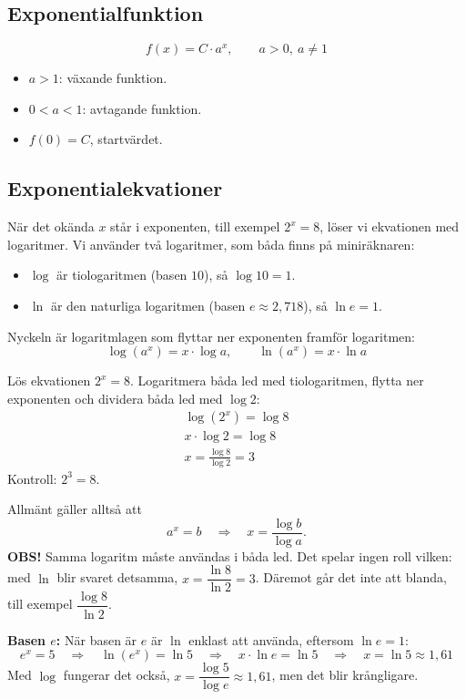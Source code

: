 \subsection{Exponentialfunktion}
\label{c8:sec:exponential}
\[
  f(x) = C \cdot a^x, \qquad a > 0,\ a \neq 1
\]
\begin{itemize}
  \item $a > 1$: växande funktion.
  \item $0 < a < 1$: avtagande funktion.
  \item $f(0) = C$, startvärdet.
\end{itemize}

\subsection{Exponentialekvationer}
\label{c8:sec:expekvationer}
När det okända $x$ står i exponenten, till exempel $2^x = 8$, löser vi ekvationen med logaritmer.
Vi använder två logaritmer, som båda finns på miniräknaren:
\begin{itemize}
  \item $\log$ är tiologaritmen (basen $10$), så $\log 10 = 1$.
  \item $\ln$ är den naturliga logaritmen (basen $e \approx 2{,}718$), så $\ln e = 1$.
\end{itemize}
Nyckeln är logaritmlagen som flyttar ner exponenten framför logaritmen:
\[
  \log(a^x) = x \cdot \log a, \qquad \ln(a^x) = x \cdot \ln a
\]

\begin{exempel}
Lös ekvationen $2^x = 8$. Logaritmera båda led med tiologaritmen, flytta ner exponenten och
dividera båda led med $\log 2$:
\begin{gather*}
  \log(2^x) = \log 8 \\
  x \cdot \log 2 = \log 8 \\
  x = \frac{\log 8}{\log 2} = 3
\end{gather*}
Kontroll: $2^3 = 8$.
\end{exempel}

Allmänt gäller alltså att
\[
  a^x = b \quad \Rightarrow \quad x = \frac{\log b}{\log a}.
\]
\textbf{OBS!} Samma logaritm måste användas i båda led. Det spelar ingen roll vilken: med $\ln$
blir svaret detsamma, $x = \dfrac{\ln 8}{\ln 2} = 3$. Däremot går det inte att blanda, till exempel
$\dfrac{\log 8}{\ln 2}$.

\textbf{Basen $e$:} När basen är $e$ är $\ln$ enklast att använda, eftersom $\ln e = 1$:
\[
  e^x = 5 \quad \Rightarrow \quad \ln(e^x) = \ln 5 \quad \Rightarrow \quad x \cdot \ln e = \ln 5
  \quad \Rightarrow \quad x = \ln 5 \approx 1{,}61
\]
Med $\log$ fungerar det också, $x = \dfrac{\log 5}{\log e} \approx 1{,}61$, men det blir
krångligare.

